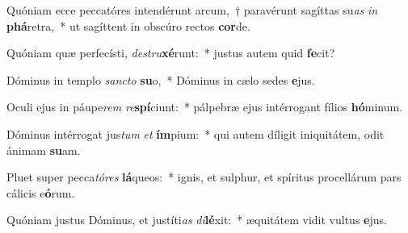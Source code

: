 \item Quóniam ecce peccatóres intendérunt arcum,~† paravérunt sagíttas su\textit{as} \textit{in} \textbf{phá}retra,~* ut sagíttent in obscúro rectos \textbf{cor}de.
\item Quóniam quæ perfecísti, \textit{de}\textit{stru}\textbf{xé}runt:~* justus autem quid \textbf{fe}cit?
\item Dóminus in templo \textit{sanc}\textit{to} \textbf{su}o,~* Dóminus in cælo sedes \textbf{e}jus.
\item Oculi ejus in páupe\textit{rem} \textit{re}\textbf{spí}ciunt:~* pálpebræ ejus intérrogant fílios \textbf{hó}minum.
\item Dóminus intérrogat jus\textit{tum} \textit{et} \textbf{ím}pium:~* qui autem díligit iniquitátem, odit ánimam \textbf{su}am.
\item Pluet super pecca\textit{tó}\textit{res} \textbf{lá}queos:~* ignis, et sulphur, et spíritus procellárum pars cálicis e\textbf{ó}rum.
\item Quóniam justus Dóminus, et justíti\textit{as} \textit{di}\textbf{lé}xit:~* æquitátem vidit vultus \textbf{e}jus.
